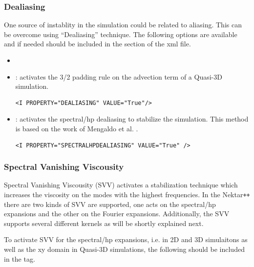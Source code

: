 \subsubsection{Dealiasing}
One source of instablity in the simulation could be related to aliasing. This can
be overcome using ``Dealiasing'' technique. The following options are available
and if needed should be included in the  section of the xml file.
\begin{itemize}
\item {} 
\item {}: activates the 3/2 padding
rule on the advection term of a Quasi-3D simulation.
\begin{lstlisting}[style=XMLStyle]
<I PROPERTY="DEALIASING" VALUE="True"/>
\end{lstlisting}

\item {}: activates the spectral/hp dealiasing to
stabilize the simulation. This method is based on the work of Mengaldo et al. \cite{mengaldo2015dealiasing}.
\begin{lstlisting}[style=XMLStyle]
<I PROPERTY="SPECTRALHPDEALIASING" VALUE="True" />
\end{lstlisting}
\end{itemize}

\subsubsection{Spectral Vanishing Viscousity}
Spectral Vanishing Viscousity (SVV) activates a stabilization technique
which increases the viscosity on the modes with the highest frequencies. In the
Nektar\texttt{++} there are two kinds of SVV are supported, one acts on the 
spectral/hp expansions and the other on the Fourier expansions. Additionally, the
SVV supports several different kernels as will be shortly explained next.



To activate SVV for the spectral/hp expansions, i.e. in 2D and 3D simulaitons 
as well as the xy domain in Quasi-3D simulations, the following should be 
included in the  tag.

